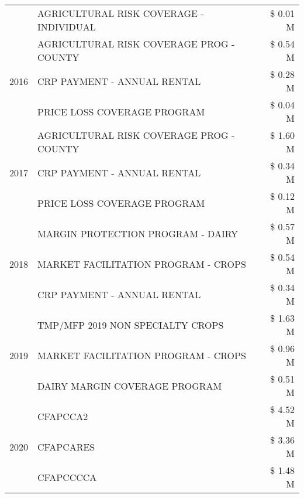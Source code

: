 \begin{tabular}{llr}
 & AGRICULTURAL RISK COVERAGE - INDIVIDUAL & \$ 0.01 M \\
\cline{1-3}
\multirow[t]{3}{*}{2016} & AGRICULTURAL RISK COVERAGE PROG - COUNTY & \$ 0.54 M \\
 & CRP PAYMENT - ANNUAL RENTAL & \$ 0.28 M \\
 & PRICE LOSS COVERAGE PROGRAM & \$ 0.04 M \\
\cline{1-3}
\multirow[t]{3}{*}{2017} & AGRICULTURAL RISK COVERAGE PROG - COUNTY & \$ 1.60 M \\
 & CRP PAYMENT - ANNUAL RENTAL & \$ 0.34 M \\
 & PRICE LOSS COVERAGE PROGRAM & \$ 0.12 M \\
\cline{1-3}
\multirow[t]{3}{*}{2018} & MARGIN PROTECTION PROGRAM - DAIRY & \$ 0.57 M \\
 & MARKET FACILITATION PROGRAM - CROPS & \$ 0.54 M \\
 & CRP PAYMENT - ANNUAL RENTAL & \$ 0.34 M \\
\cline{1-3}
\multirow[t]{3}{*}{2019} & TMP/MFP 2019 NON SPECIALTY CROPS & \$ 1.63 M \\
 & MARKET FACILITATION PROGRAM - CROPS & \$ 0.96 M \\
 & DAIRY MARGIN COVERAGE PROGRAM & \$ 0.51 M \\
\cline{1-3}
\multirow[t]{3}{*}{2020} & CFAPCCA2 & \$ 4.52 M \\
 & CFAPCARES & \$ 3.36 M \\
 & CFAPCCCCA & \$ 1.48 M \\
\cline{1-3}
\bottomrule
\end{tabular}
